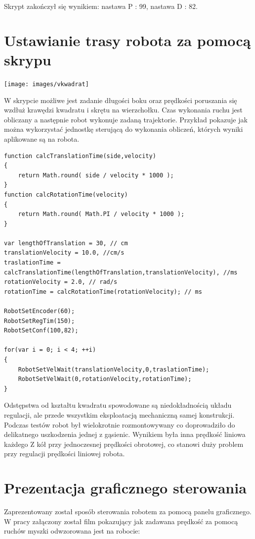 \documentclass[eng,printmode]{mgr}
\begin{document}
Skrypt zakończył się wynikiem:  nastawa P : 99, nastawa D : 82.

 \section{Ustawianie trasy robota za pomocą skrypu}

\begin{center}
  \texttt{[image: images/vkwadrat]}
\end{center}

W skrypcie możliwe jest zadanie długości boku oraz prędkości poruszania się wzdłuż krawędzi kwadratu i skrętu na wierzchołku. Czas wykonania ruchu jest obliczany a następnie robot wykonuje zadaną trajektorie. 
Przykład pokazuje jak można wykorzystać jednostkę sterującą do wykonania obliczeń, których wyniki aplikowane są na robota. 

\begin{lstlisting}[style=c]
function calcTranslationTime(side,velocity)
{
	return Math.round( side / velocity * 1000 );
}
function calcRotationTime(velocity)
{
	return Math.round( Math.PI / velocity * 1000 ); 
}

var lengthOfTranslation = 30, // cm
translationVelocity = 10.0, //cm/s
traslationTime = calcTranslationTime(lengthOfTranslation,translationVelocity), //ms
rotationVelocity = 2.0, // rad/s
rotationTime = calcRotationTime(rotationVelocity); // ms

RobotSetEncoder(60);
RobotSetRegTim(150);
RobotSetConf(100,82);

for(var i = 0; i < 4; ++i)
{
	RobotSetVelWait(translationVelocity,0,traslationTime);
	RobotSetVelWait(0,rotationVelocity,rotationTime);
}
\end{lstlisting}

Odstępstwa od kształtu kwadratu spowodowane są niedokładnością układu regulacji, ale przede wszystkim eksploatacją mechaniczną samej konstrukcji. Podczas testów robot był wielokrotnie rozmontowywany co doprowadziło do delikatnego uszkodzenia jednej z gąsienic. Wynikiem była inna prędkość liniowa każdego Z kół przy jednoczesnej prędkości obrotowej, co stanowi duży problem przy regulacji prędkości liniowej robota.

 \section{Prezentacja graficznego sterowania}
Zaprezentowany został sposób sterowania robotem za pomocą panelu graficznego. W pracy załączony został film pokazujący jak zadawana prędkość za pomocą ruchów myszki odwzorowana jest na robocie:
\end{document}
